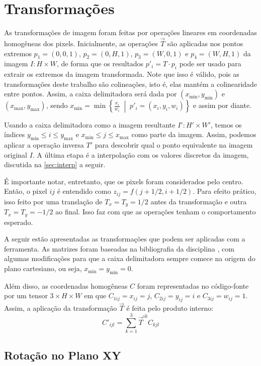 \section{Transformações} \label{sec:transformacoes}

As transformações de imagem foram feitas por operações lineares em coordenadas homogêneas dos pixels. Inicialmente, as operações $\vec{T}$ são aplicadas nos pontos extremos $p_1 = (0, 0, 1)$, $p_2 = (0, H, 1)$, $p_3 = (W, 0, 1)$ e $p_4 = (W, H, 1)$ da imagem $I: H \times W$, de forma que os resultados $p'_i = T \cdot p_i$ pode ser usado para extrair os extremos da imagem transformada. Note que isso é válido, pois as transformações deste trabalho são colineações, isto é, elas mantém a colinearidade entre pontos. Assim, a caixa delimitadora \autocite{bbox} será dada por $(x_{\min}, y_{\min})$ e $(x_{\max}, y_{\max})$, sendo $x_{\min} = \min\left\{ \frac{x_i}{w_i} \;\middle|\; p'_i = (x_i, y_i, w_i)\right\}$ e assim por diante.

Usando a caixa delimitadora como a imagem resultante $I': H' \times W'$, temos os índices $y_{\min} \leq i \leq y_{\max}$ e $x_{\min} \leq j \leq x_{\max}$ como parte da imagem. Assim, podemos aplicar a operação inversa $T'$ para descobrir qual o ponto equivalente na imagem original $I$. A última etapa é a interpolação com os valores discretos da imagem, discutida na \cref{sec:interp} a seguir.

É importante notar, entretanto, que os pixels foram considerados pelo centro. Então, o pixel $ij$ é entendido como $z_{ij} = f(j + 1/2, i + 1/2)$. Para efeito prático, isso feito por uma translação de $T_x = T_y = 1/2$ antes da transformação e outra $T_x = T_y = -1/2$ ao final. Isso faz com que as operações tenham o comportamento esperado.

A seguir estão apresentadas as transformações que podem ser aplicadas com a ferramenta. As matrizes foram baseadas na bibliografia da disciplina \autocite{helio}, com algumas modificações para que a caixa delimitadora sempre comece na origem do plano cartesiano, ou seja, $x_{\min} = y_{\min} = 0$.

Além disso, as coordenadas homogêneas $C$ foram representadas no código-fonte por um tensor $3 \times H \times W$ em que $C_{1ij} = x_{ij} = j$, $C_{2ij} = y_{ij} = i$ e $C_{3ij} = w_{ij} = 1$. Assim, a aplicação da transformação $\vec{T}$ é feita pelo produto interno:
\[
    C'_{ijl} = \sum_{k = 1}^3 \vec{T}^{ik} C_{kjl}
\]

\subsection{Rotação no Plano XY}

